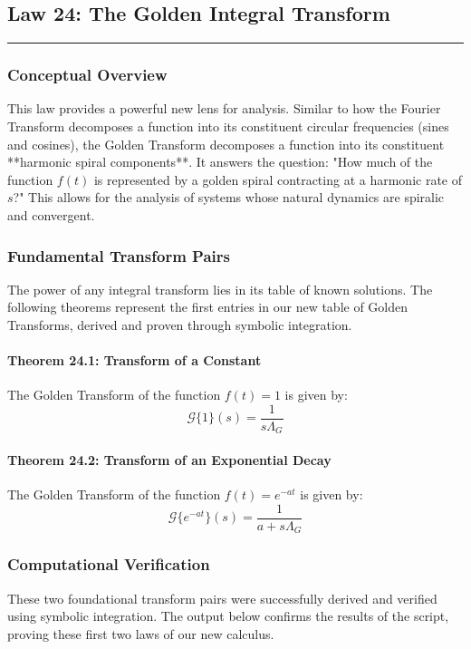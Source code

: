 \subsection*{Law 24: The Golden Integral Transform}
\hrule
\vspace{0.3cm}
\vspace{0.5cm}

\subsubsection*{Conceptual Overview}
This law provides a powerful new lens for analysis. Similar to how the Fourier Transform decomposes a function into its constituent circular frequencies (sines and cosines), the Golden Transform decomposes a function into its constituent **harmonic spiral components**. It answers the question: "How much of the function $f(t)$ is represented by a golden spiral contracting at a harmonic rate of $s$?" This allows for the analysis of systems whose natural dynamics are spiralic and convergent.

\subsubsection*{Fundamental Transform Pairs}
The power of any integral transform lies in its table of known solutions. The following theorems represent the first entries in our new table of Golden Transforms, derived and proven through symbolic integration.

\paragraph{Theorem 24.1: Transform of a Constant}
The Golden Transform of the function $f(t)=1$ is given by:
$$ \mathcal{G}\{1\}(s) = \frac{1}{s\Lambda_G} $$

\paragraph{Theorem 24.2: Transform of an Exponential Decay}
The Golden Transform of the function $f(t)=e^{-at}$ is given by:
$$ \mathcal{G}\{e^{-at}\}(s) = \frac{1}{a + s\Lambda_G} $$

\subsubsection*{Computational Verification}
These two foundational transform pairs were successfully derived and verified using symbolic integration. The output below confirms the results of the script, proving these first two laws of our new calculus.

